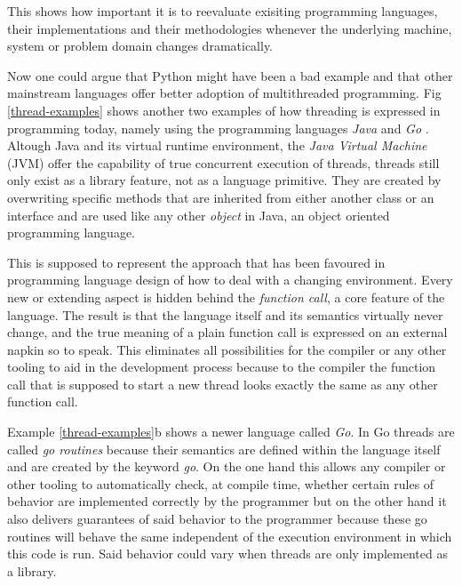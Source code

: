 This shows how important it is to reevaluate exisiting programming
languages, their implementations and their methodologies whenever the
underlying machine, system or problem domain changes dramatically.
\newline

Now one could argue that Python might have been a bad example and
that other mainstream languages offer better adoption of
multithreaded programming. Fig \ref{thread-examples}
shows another two examples of how threading is expressed in programming today,
namely using the programming languages \textit{Java} \cite{java} and
\textit{Go} \cite{golang}. Altough Java and its virtual runtime environment, the
\textit{Java Virtual Machine} (JVM) offer the capability of true
concurrent execution of threads,  threads still only exist as a library
feature, not as a language primitive. They are created by overwriting
specific methods that are inherited from either another class or an
interface and are used like any other \textit{object}
in Java, an object oriented programming language.

This is supposed to represent the approach that
has been favoured in programming language design of how to deal with
a changing environment. Every new or extending aspect is hidden behind
the \textit{function call}, a core feature of the language. The result is
that the language itself and its semantics virtually never change, and
the true meaning of a plain function call is expressed on an external
napkin so to speak. This eliminates all possibilities for the compiler
or any other tooling to aid in the development process because to the
compiler the function call that is supposed to start a new thread
looks exactly the same as any other function call.
\newline

Example \ref{thread-examples}b shows a newer language called \textit{Go}.
In Go threads are called \textit{go routines} because their semantics
are defined within the language itself and are created by the keyword
\textit{go}. On the one hand this allows
any compiler or other tooling to automatically check, at compile time,
whether certain rules of behavior are implemented correctly by the
programmer but on the other hand it also delivers guarantees of said
behavior to the programmer because these go routines will behave the
same independent of the execution environment in which this code is run.
Said behavior could vary when threads are only implemented as a library.

